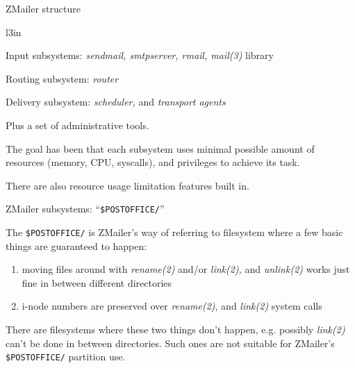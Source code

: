 \documentclass[a4paper,landscape]{slides}
\newcommand{\ZM}{ZMailer}
\begin{document}


\begin{slide}

\centerline{\large \ZM{} structure}

\begin{wrapfigure}[6]{l}{3in}
\end{wrapfigure}

Input subsystems: {\em sendmail, smtpserver, rmail, mail(3)} library

Routing subsystem: {\em router}

Delivery subsystem: {\em scheduler,} and {\em transport agents}

Plus a set of administrative tools.

The goal has been that each subsystem uses minimal possible amount of
resources ({\small memory, CPU, syscalls}), and privileges
to achieve its task.

There are also resource usage limitation
features built in.
\vfill

\end{slide}



\begin{slide}

\centerline{\large \ZM{} subsystems: ``{\tt \$POSTOFFICE/}''}

The \verb!$POSTOFFICE/! is \ZM{}'s way of referring to filesystem
where a few basic things are guaranteed to happen:
\begin{enumerate}
\item moving files around with {\em rename(2)} and/or {\em link(2),} and
      {\em unlink(2)} works just fine in between different directories
\item i-node numbers are preserved over {\em rename(2)}, and {\em link(2)}
	system calls
\end{enumerate}

There are filesystems where these two things don't happen, e.g. possibly
{\em link(2)} can't be done in between directories.  Such ones are not
suitable for \ZM's \verb!$POSTOFFICE/! partition use.

\end{slide}

\end{document}
